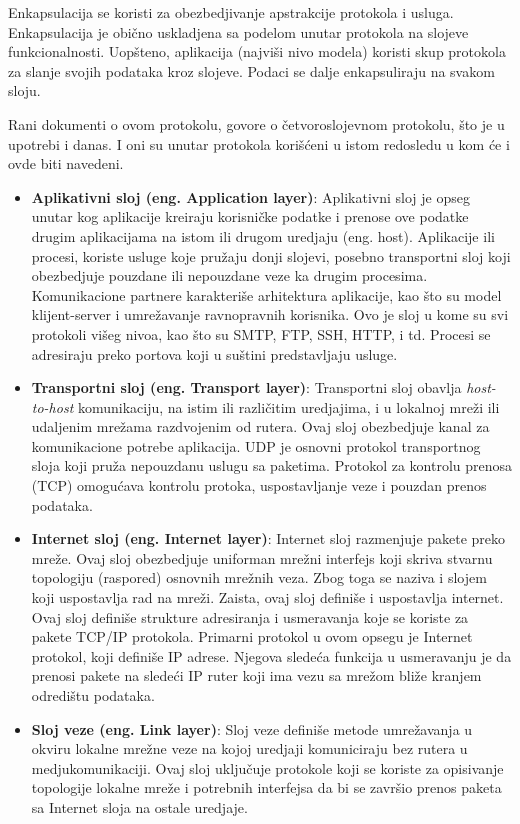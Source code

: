 \documentclass[a4paper,12pt, master]{etf}
\begin{document}
	Enkapsulacija se koristi za obezbedjivanje apstrakcije protokola i usluga.
	Enkapsulacija je obi\v{c}no uskladjena sa podelom unutar protokola na
	slojeve funkcionalnosti. Uop\v{s}teno, aplikacija (najvi\v{s}i nivo modela)
	koristi skup protokola za slanje svojih podataka kroz slojeve. Podaci se
	dalje enkapsuliraju na svakom sloju.

	Rani dokumenti o ovom protokolu, govore o \v{c}etvoroslojevnom protokolu,
	\v{s}to je u upotrebi i	danas. I oni su unutar protokola kori\v{s}\'{c}eni
	u istom redosledu u kom \'{c}e i ovde biti navedeni.

	\begin{itemize}
        \item \textbf{Aplikativni sloj (eng\@. Application layer)}:
		Aplikativni sloj je opseg unutar kog aplikacije kreiraju korisni\v{c}ke
		podatke i prenose ove podatke drugim aplikacijama na istom ili drugom
		uredjaju (eng\@. host). Aplikacije ili procesi, koriste usluge koje
		pru\v{z}aju donji slojevi, posebno transportni sloj koji
		obezbedjuje pouzdane ili nepouzdane veze ka drugim procesima.
		Komunikacione partnere karakteri\v{s}e arhitektura aplikacije, kao
		\v{s}to su model klijent-server i umre\v{z}avanje ravnopravnih
		korisnika. Ovo je sloj u kome su svi protokoli vi\v{s}eg nivoa, kao
		\v{s}to su SMTP, FTP, SSH, HTTP, i td. Procesi se adresiraju preko
		portova koji u su\v{s}tini predstavljaju usluge.
        \item \textbf{Transportni sloj (eng\@. Transport layer)}:
        Transportni sloj obavlja \textit{host-to-host} komunikaciju, na istim
        ili razli\v{c}itim uredjajima, i u lokalnoj mre\v{z}i ili
        udaljenim mre\v{z}ama razdvojenim od rutera. Ovaj sloj obezbedjuje kanal
        za komunikacione potrebe aplikacija. UDP je osnovni protokol
        transportnog sloja koji pru\v{z}a nepouzdanu uslugu sa paketima.
        Protokol za kontrolu prenosa (TCP) omogu\'{c}ava kontrolu protoka,
        uspostavljanje veze i pouzdan prenos podataka.
        \item \textbf{Internet sloj (eng\@. Internet layer)}:
		Internet sloj razmenjuje pakete preko mre\v{z}e. Ovaj sloj obezbedjuje
		uniforman mre\v{z}ni interfejs koji skriva stvarnu topologiju (raspored)
		 osnovnih mre\v{z}nih veza. Zbog toga se naziva i slojem koji
		uspostavlja rad na mre\v{z}i. Zaista, ovaj sloj defini\v{s}e i
		uspostavlja	internet. Ovaj sloj defini\v{s}e strukture adresiranja i
		usmeravanja koje se koriste za pakete TCP/IP protokola. Primarni
		protokol u ovom opsegu je Internet protokol, koji defini\v{s}e IP
		adrese. Njegova slede\'{c}a funkcija u usmeravanju je da prenosi pakete
		na slede\'{c}i IP ruter koji ima vezu sa mre\v{z}om bli\v{z}e kranjem
		odredi\v{s}tu podataka.
        \item \textbf{Sloj veze (eng\@. Link layer)}:
		Sloj veze defini\v{s}e metode umre\v{z}avanja u okviru lokalne
		mre\v{z}ne veze na kojoj uredjaji komuniciraju bez rutera u
		medjukomunikaciji. Ovaj sloj uklju\v{c}uje protokole koji se koriste za
		opisivanje topologije lokalne mre\v{z}e i potrebnih interfejsa da bi se
		zavr\v{s}io prenos paketa sa Internet sloja na ostale uredjaje.
	\end{itemize}
\end{document}
